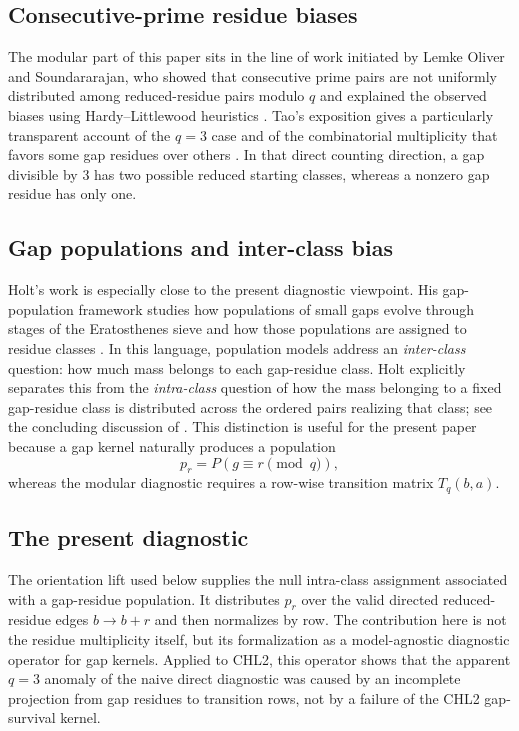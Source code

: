 \documentclass[10pt]{article}
\begin{document}
\subsection{Consecutive-prime residue biases}
The modular part of this paper sits in the line of work initiated by Lemke Oliver and Soundararajan, who showed that consecutive prime pairs are not uniformly distributed among reduced-residue pairs modulo $q$ and explained the observed biases using Hardy--Littlewood heuristics \cite{lemke-sound}.  Tao's exposition gives a particularly transparent account of the $q=3$ case and of the combinatorial multiplicity that favors some gap residues over others \cite{tao2016biases}.  In that direct counting direction, a gap divisible by $3$ has two possible reduced starting classes, whereas a nonzero gap residue has only one.

\subsection{Gap populations and inter-class bias}
Holt's work is especially close to the present diagnostic viewpoint.  His gap-population framework studies how populations of small gaps evolve through stages of the Eratosthenes sieve and how those populations are assigned to residue classes \cite{holt2016,holt2024}.  In this language, population models address an \emph{inter-class} question: how much mass belongs to each gap-residue class.  Holt explicitly separates this from the \emph{intra-class} question of how the mass belonging to a fixed gap-residue class is distributed across the ordered pairs realizing that class; see the concluding discussion of \cite{holt2024}.  This distinction is useful for the present paper because a gap kernel naturally produces a population
\[
p_r=P(g\equiv r\pmod q),
\]
whereas the modular diagnostic requires a row-wise transition matrix $T_q(b,a)$.

\subsection{The present diagnostic}
The orientation lift used below supplies the null intra-class assignment associated with a gap-residue population.  It distributes $p_r$ over the valid directed reduced-residue edges $b\to b+r$ and then normalizes by row.  The contribution here is not the residue multiplicity itself, but its formalization as a model-agnostic diagnostic operator for gap kernels.  Applied to CHL2, this operator shows that the apparent $q=3$ anomaly of the naive direct diagnostic was caused by an incomplete projection from gap residues to transition rows, not by a failure of the CHL2 gap-survival kernel.
\end{document}
